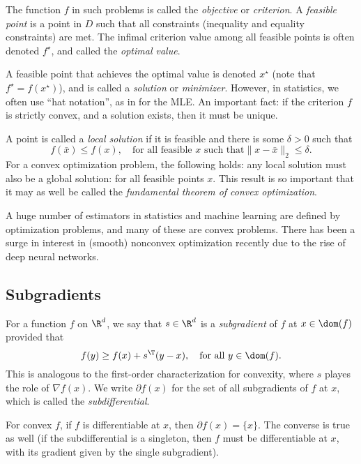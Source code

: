\documentclass{article}
\begin{document}
The function $f$ in such problems is called the \emph{objective} or
\emph{criterion}. A \emph{feasible point} is a point in $D$ such that all
constraints (inequality and equality constraints) are met. The infimal criterion
value among all feasible points is often denoted $f^\star$, and called the
\emph{optimal value}. 

A feasible point that achieves the optimal value is denoted $x^\star$ (note that
$f^\star = f(x^\star)$), and is called a  \emph{solution} or
\emph{minimizer}. However, in statistics, we often use ``hat  notation'', as in
\smash{$\htheta$} for the MLE. An important fact: if the criterion $f$ is
strictly convex, and a solution exists, then it must be unique.

A point  is called a \emph{local solution} if it is feasible
and there is some $\delta>0$ such that 
\[
f(\bar{x}) \leq f(x), \quad \text{for all feasible $x$ such that
$\|x - \bar{x}\|_2 \leq \delta$}.
\]
For a convex optimization problem, the following holds: any local solution
 must also be a global solution: 
for all feasible points $x$. This result is so important that it may as well be
called the \emph{fundamental theorem of convex optimization}.   

A huge number of estimators in statistics and machine learning are defined by
optimization problems, and many of these are convex problems. There has been a
surge in interest in (smooth) nonconvex optimization recently due to the rise of
deep neural networks.  

\subsection{Subgradients}

For a function $f$ on $\R^d$, we say that $s \in \R^d$ is a \emph{subgradient} 
of $f$ at $x \in \dom(f)$ provided that
\[
f(y) \geq f(x) + s^\T (y-x), \quad \text{for all $y \in \dom(f)$}.
\]
This is analogous to the first-order characterization for convexity, where $s$
playes the role of $\nabla f(x)$. We write $\partial f(x)$ for the set of all
subgradients of $f$ at $x$, which is called the \emph{subdifferential}.

For convex $f$, if $f$ is differentiable at $x$, then $\partial f(x) =
\{x\}$. The converse is true as well (if the subdifferential is a singleton,
then $f$ must be differentiable at $x$, with its gradient given by the single
subgradient). 
\end{document}
